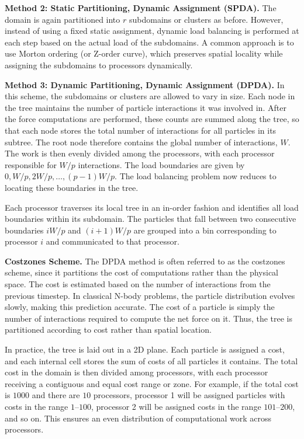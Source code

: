 \documentclass[12pt]{book}
\begin{document}
\textbf{Method 2: Static Partitioning, Dynamic Assignment (SPDA).}  
The domain is again partitioned into $r$ subdomains or clusters as before. However, instead of using a fixed static assignment, dynamic load balancing is performed at each step based on the actual load of the subdomains. A common approach is to use Morton ordering (or Z-order curve), which preserves spatial locality while assigning the subdomains to processors dynamically.

\textbf{Method 3: Dynamic Partitioning, Dynamic Assignment (DPDA).}  
In this scheme, the subdomains or clusters are allowed to vary in size. Each node in the tree maintains the number of particle interactions it was involved in. After the force computations are performed, these counts are summed along the tree, so that each node stores the total number of interactions for all particles in its subtree. The root node therefore contains the global number of interactions, $W$. The work is then evenly divided among the processors, with each processor responsible for $W/p$ interactions. The load boundaries are given by $0, W/p, 2W/p, \ldots, (p-1)W/p$. The load balancing problem now reduces to locating these boundaries in the tree.

Each processor traverses its local tree in an in-order fashion and identifies all load boundaries within its subdomain. The particles that fall between two consecutive boundaries $iW/p$ and $(i+1)W/p$ are grouped into a bin corresponding to processor $i$ and communicated to that processor.

\textbf{Costzones Scheme.}  
The DPDA method is often referred to as the costzones scheme, since it partitions the cost of computations rather than the physical space. The cost is estimated based on the number of interactions from the previous timestep. In classical N-body problems, the particle distribution evolves slowly, making this prediction accurate. The cost of a particle is simply the number of interactions required to compute the net force on it. Thus, the tree is partitioned according to cost rather than spatial location.

In practice, the tree is laid out in a 2D plane. Each particle is assigned a cost, and each internal cell stores the sum of costs of all particles it contains. The total cost in the domain is then divided among processors, with each processor receiving a contiguous and equal cost range or zone. For example, if the total cost is $1000$ and there are $10$ processors, processor 1 will be assigned particles with costs in the range $1$–$100$, processor 2 will be assigned costs in the range $101$–$200$, and so on. This ensures an even distribution of computational work across processors.
\end{document}
